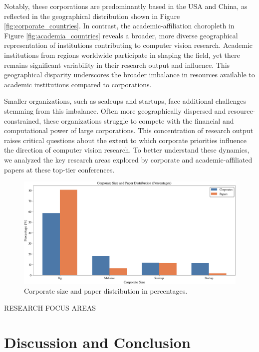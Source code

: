 \documentclass{article}
\begin{document}
Notably, these corporations are predominantly based in the USA and China, as reflected in the geographical distribution shown in Figure \ref{fig:corporate_countries}. In contrast, the academic-affiliation choropleth in Figure \ref{fig:academia_countries} reveals a broader, more diverse geographical representation of institutions contributing to computer vision research. Academic institutions from regions worldwide participate in shaping the field, yet there remains significant variability in their research output and influence. This geographical disparity underscores the broader imbalance in resources available to academic institutions compared to corporations.

Smaller organizations, such as scaleups and startups, face additional challenges stemming from this imbalance. Often more geographically dispersed and resource-constrained, these organizations struggle to compete with the financial and computational power of large corporations. This concentration of research output raises critical questions about the extent to which corporate priorities influence the direction of computer vision research. To better understand these dynamics, we analyzed the key research areas explored by corporate and academic-affiliated papers at these top-tier conferences.

\begin{figure}[ht]
  \centering
  \includegraphics[width=\textwidth]{report/images/corporate_paper_distribution.png}  
  \caption{Corporate size and paper distribution in percentages.}
  \label{fig:corporate_size_graph}
\end{figure}

RESEARCH FOCUS AREAS

\section{Discussion and Conclusion}
\end{document}
